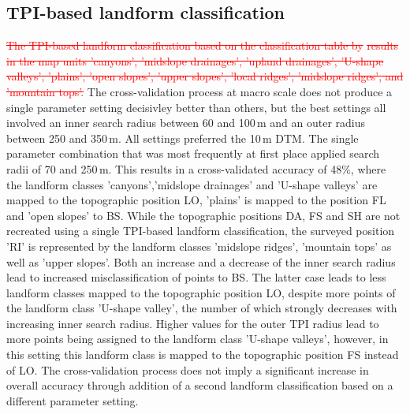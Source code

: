 \documentclass[preprint,12pt,authoryear]{elsarticle}
\begin{document}
\subsection{TPI-based landform classification}
\textcolor{red}{\sout{The TPI-based landform classification based on the  classification table by}} \cite{Weiss2000} \textcolor{red}{\sout{results in the map units 'canyons', 'midslope drainages', 'upland drainages', 'U-shape valleys', 'plains', 'open slopes', 'upper slopes', 'local ridges', 'midslope ridges', and 'mountain tops'.}} The cross-validation process at macro scale does not produce a single parameter setting decisivley better than others, but the best settings all involved an inner search radius between 60 and 100\,m and an outer radius between 250  and 350\,m. All settings preferred the 10\,m DTM. The single parameter combination that was most frequently at first place applied search radii of 70 and 250\,m. This results in a cross-validated accuracy of 48\%, where the landform classes 'canyons','midslope drainages' and 'U-shape valleys' are mapped to the topographic position LO, 'plains' is mapped to the position FL and 'open slopes' to BS. While the topographic positions DA, FS and SH are not recreated using a single TPI-based landform classification, the surveyed position 'RI' is represented by the landform classes 'midslope ridges', 'mountain tops' as well as 'upper slopes'. Both an increase and a decrease of the inner search radius lead to increased misclassification of points to BS. The latter case leads to less landform classes mapped to the topographic position LO, despite more points of the landform class 'U-shape valley', the number of which strongly decreases with increasing inner search radius. Higher values for the outer TPI radius lead to more points being assigned to the landform class 'U-shape valleys', however, in this setting this landform class is mapped to the topographic position FS instead of LO. The cross-validation process does not imply a significant increase in overall accuracy through addition of a second landform classification based on a different parameter setting.   
\end{document}
